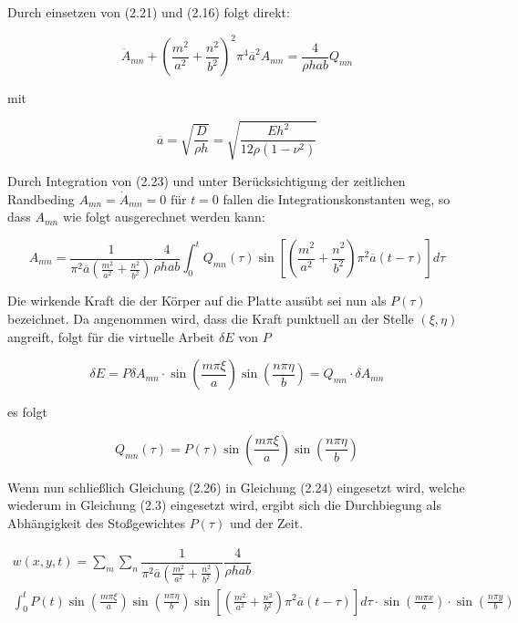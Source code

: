 Durch einsetzen von (2.21) und (2.16) folgt direkt:

\begin{equation}
\ddot{A}_{mn} + \left(\dfrac{m^2}{a^2} + \dfrac{n^2}{b^2}\right)^2 \pi^4 \overline{a}^2 A_{mn} = \dfrac{4}{\rho h a b} Q_{mn}
\end{equation}

mit 

$$\overline{a} = \sqrt{\dfrac{D}{\rho h}} = \sqrt{\dfrac{E h^2}{12 \rho (1-\nu^2)}}$$


Durch Integration von (2.23) und unter Berücksichtigung der zeitlichen Randbeding $A_{mn} = \dot{A}_{mn} = 0 \text{ für } t = 0$ fallen die Integrationskonstanten weg, so dass $A_{mn}$ wie folgt ausgerechnet werden kann:

\begin{equation}
A_{mn} = \dfrac{1}{\pi^2 \overline{a}  \left(\frac{m^2}{a^2} + \frac{n^2}{b^2} \right)} \dfrac{4}{\rho h a b} \int_0^t	Q_{mn}(\tau) \sin \left[ \left(\frac{m^2}{a^2} + \frac{n^2}{b^2} \right) \pi^2 \overline{a} (t-\tau)\right] d\tau
\end{equation}


Die wirkende Kraft die der Körper auf die Platte ausübt sei nun als $P(\tau)$ bezeichnet. 
Da angenommen wird, dass die Kraft punktuell an der Stelle $(\xi, \eta)$ angreift, folgt für die virtuelle Arbeit $\delta E$ von $P$

\begin{equation}
\delta E = P \delta A_{mn} \cdot \sin \left( \frac{m \pi \xi}{a} \right) \sin \left( \frac{n \pi \eta}{b} \right) = Q_{mn} \cdot \delta A_{mn}
\end{equation} 

es folgt

\begin{equation}
Q_{mn}(\tau) = P(\tau) \sin \left( \frac{m \pi \xi}{a} \right) \sin \left( \frac{n \pi \eta}{b} \right)
\end{equation}



Wenn nun schließlich Gleichung (2.26) in Gleichung (2.24) eingesetzt wird, welche wiederum in Gleichung (2.3) eingesetzt wird, ergibt sich die Durchbiegung als Abhängigkeit des Stoßgewichtes $P(\tau)$ und der Zeit.

\begin{multline}
w(x,y,t) = \sum_m \sum_n 
\dfrac{1}{\pi^2 \overline{a}  \left(\frac{m^2}{a^2} + \frac{n^2}{b^2} \right)} \dfrac{4}{\rho h a b} \\ \int_0^t
 P(t) \sin \left( \frac{m \pi \xi}{a} \right) \sin \left( \frac{n \pi \eta}{b} \right)
\sin \left[ \left(\frac{m^2}{a^2} + \frac{n^2}{b^2} \right) \pi^2 \overline{a} (t-\tau)\right] d\tau
\cdot \sin\left(\frac{m \pi x}{a}\right) \cdot \sin\left(\frac{n \pi y}{b}\right)
\end{multline}

